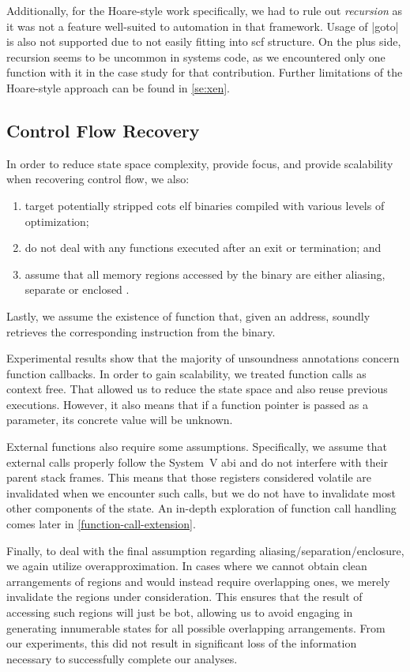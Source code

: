 Additionally, for the Hoare-style work specifically, we had to rule out \emph{recursion} as it was not a feature well-suited to automation in that framework.
Usage of \inlineasm|goto| is also not supported due to not easily fitting into \ac{scf} structure.
On the plus side, recursion seems to be uncommon in systems code, as we encountered only one function with it in the case study for that contribution.
Further limitations of the Hoare-style approach can be found in \cref{se:xen}.

\subsection{Control Flow Recovery}\label{cfr-assumptions}
In order to reduce state space complexity, provide focus, and provide scalability when recovering control flow, we also:
\begin{enumerate}
  \item target potentially stripped \ac{cots} \ac{elf} binaries compiled with various levels of optimization;
  \item do not deal with any functions executed after an exit or termination; and
  \item assume that all memory regions accessed by the binary are either aliasing, separate or enclosed \autocite{balakrishnan2004analyzing,balakrishnan2005codesurfer}.
\end{enumerate}
Lastly, we assume the existence of  function that, given an address, soundly retrieves the corresponding instruction from the binary.

Experimental results show that the majority of unsoundness annotations concern function callbacks.
In order to gain scalability, we treated function calls as context free.
That allowed us to reduce the state space and also reuse previous executions.
However, it also means that if a function pointer is passed as a parameter, its concrete value will be unknown.

External functions also require some assumptions.
Specifically, we assume that external calls properly follow the System~V \ac{abi} and do not interfere with their parent stack frames.
This means that those registers considered volatile are invalidated when we encounter such calls, but we do not have to invalidate most other components of the state.
An in-depth exploration of function call handling comes later in \cref{function-call-extension}.

Finally, to deal with the final assumption regarding aliasing/separation/enclosure, we again utilize overapproximation.
In cases where we cannot obtain clean arrangements of regions and would instead require overlapping ones, we merely invalidate the regions under consideration.
This ensures that the result of accessing such regions will just be \gls{bot}, allowing us to avoid engaging in generating innumerable states for all possible overlapping arrangements.
From our experiments, this did not result in significant loss of the information necessary to successfully complete our analyses.

